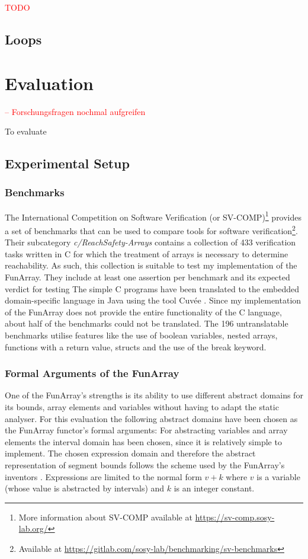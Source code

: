 \documentclass{report}
\begin{document}
\noindent\textcolor{red}{TODO}


\section{Loops}


\chapter{Evaluation}
\textcolor{red}{-- Forschungsfragen nochmal aufgreifen}

To evaluate 

\section{Experimental Setup}
\subsection{Benchmarks}

The International Competition on Software Verification (or SV-COMP)\footnote{More information about SV-COMP available at \url{https://sv-comp.sosy-lab.org/}} provides a set of benchmarks that can be used to compare tools for software verification\footnote{Available at \url{https://gitlab.com/sosy-lab/benchmarking/sv-benchmarks}}. Their subcategory \textit{c/ReachSafety-Arrays} contains a collection of 433 verification tasks written in C for which the treatment of arrays is necessary to determine reachability. As such, this collection is suitable to test my implementation of the FunArray. They include at least one assertion per benchmark and its expected verdict for testing 
The simple C programs have been translated to the embedded domain-specific language in Java using the tool Cuv\'ee \cite{ernst2020}. Since my implementation of the FunArray does not provide the entire functionality of the C language, about half of the benchmarks could not be translated. The 196 untranslatable benchmarks utilise features like the use of boolean variables, nested arrays, functions with a return value, structs and the use of the break keyword.

\subsection{Formal Arguments of the FunArray}

One of the FunArray's strengths is its ability to use different abstract domains for its bounds, array elements and variables without having to adapt the static analyser. For this evaluation the following abstract domains have been chosen as the FunArray functor's formal arguments: For abstracting variables and array elements the interval domain has been chosen, since it is relatively simple to implement. The chosen expression domain and therefore the abstract representation of segment bounds follows the scheme used by the FunArray's inventors \cite[section 7.2]{cousot2011}. Expressions are limited to the normal form $v+k$ where $v$ is a variable (whose value is abstracted by intervals) and $k$ is an integer constant.
\end{document}
